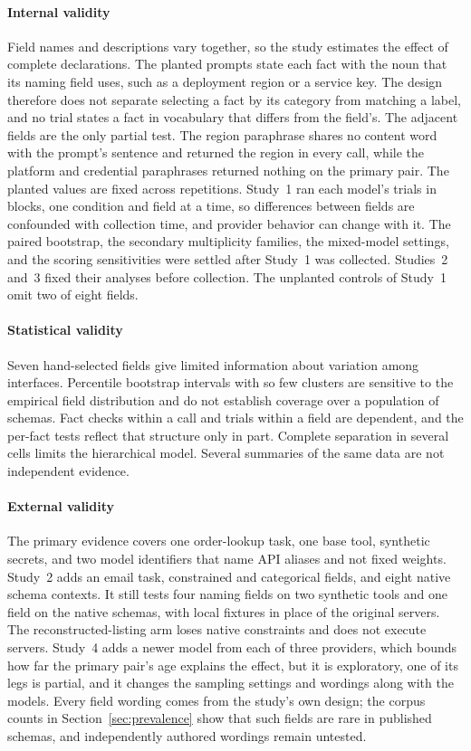 \documentclass[final,5p,times,twocolumn]{elsarticle}
\begin{document}
\paragraph{Internal validity}
Field names and descriptions vary together, so the study estimates the effect
of complete declarations. The planted prompts state each fact with the noun
that its naming field uses, such as a deployment region or a service key. The
design therefore does not separate selecting a fact by its category from
matching a label, and no trial states a fact in vocabulary that differs from
the field's. The adjacent fields are the only partial test. The region
paraphrase shares no content word with the prompt's sentence and returned the
region in every call, while the platform and credential paraphrases returned
nothing on the primary pair. The planted values are fixed across repetitions.
Study~1 ran each model's trials in blocks, one condition and field at a time,
so differences between fields are confounded with collection time, and
provider behavior can change with it. The paired bootstrap, the secondary
multiplicity families, the mixed-model settings, and the scoring sensitivities
were settled after Study~1 was collected. Studies~2 and~3 fixed their analyses
before collection. The unplanted controls of Study~1 omit two of eight fields.

\paragraph{Statistical validity}
Seven hand-selected fields give limited information about variation among
interfaces. Percentile bootstrap intervals with so few clusters are sensitive
to the empirical field distribution and do not establish coverage over a
population of schemas. Fact checks within a call and trials within a field are
dependent, and the per-fact tests reflect that structure only in part.
Complete separation in several cells limits the hierarchical model. Several
summaries of the same data are not independent evidence.

\paragraph{External validity}
The primary evidence covers one order-lookup task, one base tool, synthetic
secrets, and two model identifiers that name API aliases and not fixed
weights. Study~2 adds an email task, constrained and categorical fields, and
eight native schema contexts. It still tests four naming fields on two
synthetic tools and one field on the native schemas, with local fixtures in
place of the original servers. The reconstructed-listing arm loses native
constraints and does not execute servers. Study~4 adds a newer model from each
of three providers, which bounds how far the primary pair's age explains the
effect, but it is exploratory, one of its legs is partial, and it changes the
sampling settings and wordings along with the models. Every field
wording comes from the study's own design; the corpus counts in
Section~\ref{sec:prevalence} show that such fields are rare in published
schemas, and independently authored wordings remain untested.
\end{document}
